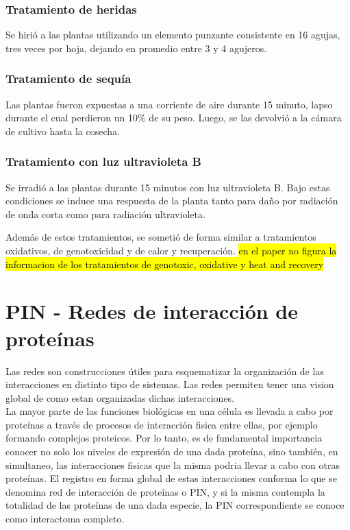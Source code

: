 \subsubsection*{Tratamiento de heridas}
Se hirió a las plantas utilizando un elemento punzante consistente en 16 agujas, tres veces por hoja, dejando en promedio entre 3 y 4 agujeros.
\subsubsection*{Tratamiento de sequía}
Las plantas fueron expuestas a una corriente de aire durante 15 minuto, lapso durante el cual perdieron un 10\% de su peso. Luego, se las devolvió a la cámara de cultivo hasta la cosecha.
\subsubsection*{Tratamiento con luz ultravioleta B}
Se irradió a las plantas durante 15 minutos con luz ultravioleta B. Bajo estas condiciones se induce una respuesta de la planta tanto para daño por radiación de onda corta como para radiación ultravioleta.

Además de estos tratamientos, se sometió de forma similar a tratamientos oxidativos, de genotoxicidad y de calor y recuperación.
\hl{en el paper no figura la informacion de los tratamientos de genotoxic, oxidative y heat and recovery}
\cite{AtGenExpress, Kilian2007}
\section{PIN - Redes de interacción de proteínas}
\label{sec:redes}
Las redes son construcciones útiles para esquematizar la organización de las interacciones en distinto tipo de sistemas. Las redes permiten tener una vision global de como estan organizadas dichas interacciones.\\
La mayor parte de las funciones biológicas en una célula es llevada a cabo por proteínas a través de procesos de interacción fisica entre ellas, por ejemplo formando complejos proteicos. Por lo tanto, es de fundamental importancia conocer no solo los niveles de expresión de una dada proteína, sino también, en simultaneo, las interacciones fisicas que la misma podria llevar a cabo con otras proteínas. El registro en forma global de estas interacciones conforma lo que se denomina red de interacción de proteínas o PIN, y si la misma contempla la totalidad de las proteínas de una dada especie, la PIN correspondiente se conoce como interactoma completo.\\
